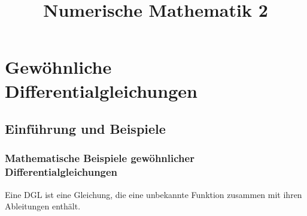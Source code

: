 \documentclass[
]{mycourse}
\title{Numerische Mathematik 2}
\author{}
\begin{document}
\maketitle
\tableofcontents

\chapter{Gewöhnliche Differentialgleichungen}


\section{Einführung und Beispiele}


\subsection{Mathematische Beispiele gewöhnlicher Differentialgleichungen}

Eine DGL ist eine Gleichung, die eine unbekannte Funktion zusammen mit ihren Ableitungen enthält.
\end{document}
